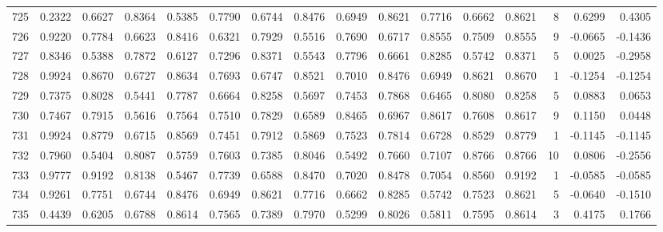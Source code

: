 \begin{tabular}{lrrrrrrrrrrrrrrr}
725 &      0.2322 &  0.6627 &  0.8364 &  0.5385 &  0.7790 &  0.6744 &  0.8476 &  0.6949 &  0.8621 &  0.7716 &   0.6662 &     0.8621 &      8 &                    0.6299 &                     0.4305 \\
726 &      0.9220 &  0.7784 &  0.6623 &  0.8416 &  0.6321 &  0.7929 &  0.5516 &  0.7690 &  0.6717 &  0.8555 &   0.7509 &     0.8555 &      9 &                   -0.0665 &                    -0.1436 \\
727 &      0.8346 &  0.5388 &  0.7872 &  0.6127 &  0.7296 &  0.8371 &  0.5543 &  0.7796 &  0.6661 &  0.8285 &   0.5742 &     0.8371 &      5 &                    0.0025 &                    -0.2958 \\
728 &      0.9924 &  0.8670 &  0.6727 &  0.8634 &  0.7693 &  0.6747 &  0.8521 &  0.7010 &  0.8476 &  0.6949 &   0.8621 &     0.8670 &      1 &                   -0.1254 &                    -0.1254 \\
729 &      0.7375 &  0.8028 &  0.5441 &  0.7787 &  0.6664 &  0.8258 &  0.5697 &  0.7453 &  0.7868 &  0.6465 &   0.8080 &     0.8258 &      5 &                    0.0883 &                     0.0653 \\
730 &      0.7467 &  0.7915 &  0.5616 &  0.7564 &  0.7510 &  0.7829 &  0.6589 &  0.8465 &  0.6967 &  0.8617 &   0.7608 &     0.8617 &      9 &                    0.1150 &                     0.0448 \\
731 &      0.9924 &  0.8779 &  0.6715 &  0.8569 &  0.7451 &  0.7912 &  0.5869 &  0.7523 &  0.7814 &  0.6728 &   0.8529 &     0.8779 &      1 &                   -0.1145 &                    -0.1145 \\
732 &      0.7960 &  0.5404 &  0.8087 &  0.5759 &  0.7603 &  0.7385 &  0.8046 &  0.5492 &  0.7660 &  0.7107 &   0.8766 &     0.8766 &     10 &                    0.0806 &                    -0.2556 \\
733 &      0.9777 &  0.9192 &  0.8138 &  0.5467 &  0.7739 &  0.6588 &  0.8470 &  0.7020 &  0.8478 &  0.7054 &   0.8560 &     0.9192 &      1 &                   -0.0585 &                    -0.0585 \\
734 &      0.9261 &  0.7751 &  0.6744 &  0.8476 &  0.6949 &  0.8621 &  0.7716 &  0.6662 &  0.8285 &  0.5742 &   0.7523 &     0.8621 &      5 &                   -0.0640 &                    -0.1510 \\
735 &      0.4439 &  0.6205 &  0.6788 &  0.8614 &  0.7565 &  0.7389 &  0.7970 &  0.5299 &  0.8026 &  0.5811 &   0.7595 &     0.8614 &      3 &                    0.4175 &                     0.1766 \\

\end{tabular}

